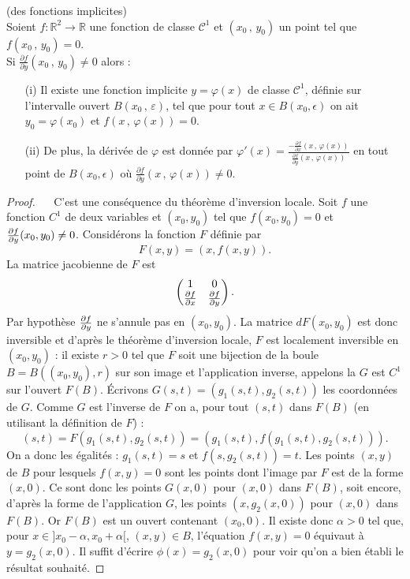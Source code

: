 \documentclass[12pt, class=report,crop=false]{standalone}
\begin{document}
{{{{\begin{theoreme} (des fonctions implicites)\\
Soient $f : \mathbb{R}^2 \rightarrow \mathbb{R}$ une fonction de classe $\mathcal{C}^1$ et $(x_{0}\,,\,y_{0})$ un point tel que $f(x_{0}\,,\,y_{0}) = 0$.\\
Si $\displaystyle \frac{\partial f}{\partial y}(x_{0}\,,\,y_{0}) \neq 0$ alors :
\begin{enumerate}
\item[(i)] Il existe une fonction implicite $y = \varphi(x)$ de classe $\mathcal{C}^1$, définie sur l'intervalle ouvert $B(x_{0}\,,\,\varepsilon)$, tel que pour tout $x\in B(x_0,\epsilon)$ on ait $y_{0} = \varphi(x_{0})$ et $f(x\,,\,\varphi(x)) = 0$.
\item[(ii)] De plus, la dérivée de $\varphi$ est donnée par $\displaystyle \varphi'(x) = \frac{-\frac{\partial f}{\partial x}(x\,,\, \varphi(x))}{\frac{\partial f}{\partial y}(x\,,\, \varphi(x))}$ en tout point de $B(x_0,\epsilon)$ o\`u $\displaystyle \frac{\partial f}{\partial y}(x\,,\,\varphi(x)) \neq 0$.
\end{enumerate}
\end{theoreme}
\begin{proof} ~~
C'est une conséquence du théor\`eme d'inversion locale. Soit $f$ une fonction $C^1$ de deux variables et $(x_0,y_0)$ tel que $f(x_0,y_0)=0$ et ${{\partial f}\over{\partial y}}(x_0,y_0)\neq 0$. Considérons la fonction $F$ définie par
$$
F(x,y)=(x,f(x,y)).
$$
La matrice jacobienne de $F$ est
$$
\begin{pmatrix}  1&0\\ {{\partial f}\over{\partial x}} & {{\partial f}\over{\partial y}}  \end{pmatrix}.
$$
Par hypoth\`ese ${{\partial f}\over{\partial y}}$ ne s'annule pas en $(x_0,y_0)$. La matrice $dF(x_0,y_0)$ est donc inversible et d'apr\`es le théor\`eme d'inversion locale, $F$ est localement inversible en $(x_0,y_0)$ : il existe $r>0$ tel que $F$ soit une bijection de la boule $B=B((x_0,y_0),r)$ sur son image et l'application inverse, appelons la $G$ est $C^1$ sur l'ouvert $F(B)$. \'Ecrivons $G(s,t)=(g_1(s,t),g_2(s,t))$ les coordonnées de $G$. Comme $G$ est l'inverse de $F$ on a, pour tout $(s,t)$ dans $F(B)$ (en utilisant la définition de $F$) :
$$
(s,t)=F(g_1(s,t),g_2(s,t))=(g_1(s,t),f(g_1(s,t),g_2(s,t))).
$$
On a donc les égalités : $g_1(s,t)=s$ et $f(s,g_2(s,t))=t$.
Les points $(x,y)$ de $B$ pour lesquels $f(x,y)=0$ sont les points dont l'image par $F$ est de la forme $(x,0)$. Ce sont donc les points $G(x,0)$ pour $(x,0)$ dans $F(B)$, soit encore, d'apr\`es la forme de l'application $G$, les points $(x,g_2(x,0))$ pour $(x,0)$ dans $F(B)$. Or $F(B)$ est un ouvert contenant $(x_0,0)$. Il existe donc $\alpha>0$ tel que, pour $x\in]x_0-\alpha,x_0+\alpha[$, $(x,y)\in B$, l'équation $f(x,y)=0$ équivaut \`a $y=g_2(x,0)$. Il suffit d'écrire $\phi(x)=g_2(x,0)$ pour voir qu'on a bien établi le résultat souhaité.
\end{proof}

}}}}
\end{document}

